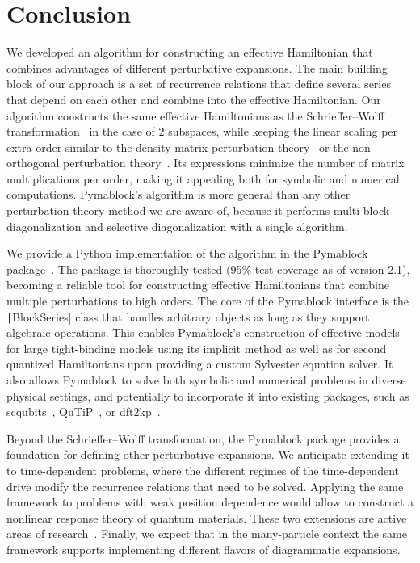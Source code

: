 \section{Conclusion}

We developed an algorithm for constructing an effective Hamiltonian that combines advantages of different perturbative expansions.
The main building block of our approach is a set of recurrence relations that define several series that depend on each other and combine into the effective Hamiltonian.
Our algorithm constructs the same effective Hamiltonians as the Schrieffer--Wolff transformation~\cite{Schrieffer_1966} in the case of $2$ subspaces, while keeping the linear scaling per extra order similar to the density matrix perturbation theory~\cite{McWeeny_1962, Truflandier_2020} or the non-orthogonal perturbation theory~\cite{Bloch_1958}.
Its expressions minimize the number of matrix multiplications per order, making it appealing both for symbolic and numerical computations.
Pymablock's algorithm is more general than any other perturbation theory method we are aware of, because it performs multi-block diagonalization and selective diagonalization with a single algorithm.

We provide a Python implementation of the algorithm in the Pymablock package~\cite{Araya_2024}.
The package is thoroughly tested (95\% test coverage as of version 2.1), becoming a reliable tool for constructing effective Hamiltonians that combine multiple perturbations to high orders.
The core of the Pymablock interface is the \texttt|BlockSeries| class that handles arbitrary objects as long as they support algebraic operations.
This enables Pymablock's construction of effective models for large tight-binding models using its implicit method as well as for second quantized Hamiltonians upon providing a custom Sylvester equation solver.
It also allows Pymablock to solve both symbolic and numerical problems in diverse physical settings, and potentially to incorporate it into existing packages, such as scqubits~\cite{Groszkowski_2021}, QuTiP~\cite{Johansson_2012,Johansson_2013}, or dft2kp~\cite{Cassiano_2024}.

Beyond the Schrieffer--Wolff transformation, the Pymablock package provides a foundation for defining other perturbative expansions.
We anticipate extending it to time-dependent problems, where the different regimes of the time-dependent drive modify the recurrence relations that need to be solved.
Applying the same framework to problems with weak position dependence would allow to construct a nonlinear response theory of quantum materials.
These two extensions are active areas of research~\cite{Motzoi_2009,Bernevig_2021,Theis_2018,Venkatraman_2022,Xu_2024b, Reascos_2024}.
Finally, we expect that in the many-particle context the same framework supports implementing different flavors of diagrammatic expansions.
